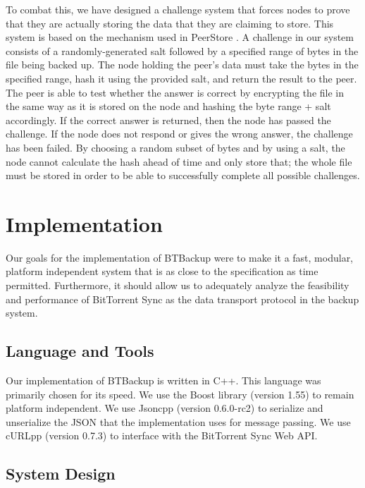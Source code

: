 \documentclass[12pt]{report}
\begin{document}
To combat this, we have designed a challenge system that forces nodes to prove that they are actually storing the data that they are claiming to store. This system is based on the mechanism used in PeerStore \cite{PeerStore}. A challenge in our system consists of a randomly-generated salt followed by a specified range of bytes in the file being backed up. The node holding the peer's data must take the bytes in the specified range, hash it using the provided salt, and return the result to the peer. The peer is able to test whether the answer is correct by encrypting the file in the same way as it is stored on the node and hashing the byte range + salt accordingly. If the correct answer is returned, then the node has passed the challenge. If the node does not respond or gives the wrong answer, the challenge has been failed. By choosing a random subset of bytes and by using a salt, the node cannot calculate the hash ahead of time and only store that; the whole file must be stored in order to be able to successfully complete all possible challenges.


\chapter{Implementation} \label{chap:impl}

Our goals for the implementation of BTBackup were to make it a fast, modular, platform independent system that is as close to the specification as time permitted. Furthermore, it should allow us to adequately analyze the feasibility and performance of BitTorrent Sync as the data transport protocol in the backup system.

\section{Language and Tools}

Our implementation of BTBackup is written in C++. This language was primarily chosen for its speed. We use the Boost library (version 1.55) to remain platform independent. We use Jsoncpp (version 0.6.0-rc2) to serialize and unserialize the JSON that the implementation uses for message passing. We use cURLpp (version 0.7.3) to interface with the BitTorrent Sync Web API.

\section{System Design}
\end{document}
